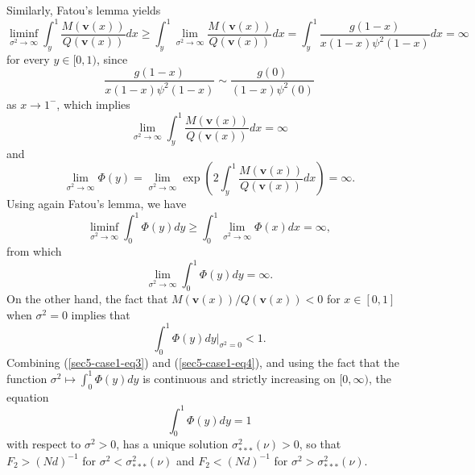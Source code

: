 \documentclass[11pt]{article}
\begin{document}
Similarly, Fatou's lemma yields
\begin{equation}
\liminf_{\sigma^2\rightarrow\infty}\int_{y}^{1}\frac{M(\mathbf{v}(x))}{Q(\mathbf{v}(x))}dx\geq\int_{y}^{1}\lim_{\sigma^2\rightarrow\infty}\frac{M(\mathbf{v}(x))}{Q(\mathbf{v}(x))}dx=\int_{y}^{1}\frac{g(1-x)}{x(1-x)\psi^2(1-x)}dx=\infty
\end{equation}
for every $y\in[0,1)$,
since 
\begin{equation}
\frac{g(1-x)}{x(1-x)\psi^2(1-x)}\sim \frac{g(0)}{(1-x)\psi^2(0)}
\end{equation}
as $x\rightarrow1^{-}$,
which implies
\begin{equation}
\lim_{\sigma^2\rightarrow\infty}\int_{y}^{1}\frac{M(\mathbf{v}(x))}{Q(\mathbf{v}(x))}dx=\infty
\end{equation}
and
  \begin{equation}
\lim_{\sigma^2\rightarrow\infty}\Phi(y)=\lim_{\sigma^2\rightarrow\infty}\exp\left(2\int_{y}^{1}\frac{M(\mathbf{v}(x))}{Q(\mathbf{v}(x))}dx\right)=\infty.
\end{equation}
Using again Fatou's lemma, we have
\begin{equation}
\liminf_{\sigma^2\rightarrow\infty}\int_{0}^{1}\Phi(y)dy\geq\int_{0}^{1}\lim_{\sigma^2\rightarrow\infty}\Phi(x)dx=\infty,
\end{equation}
from which 
\begin{equation}\label{sec5-case1-eq3}
\lim_{\sigma^2\rightarrow\infty}\int_{0}^{1}\Phi(y)dy=\infty.
\end{equation}
On the other hand,  the fact that  $M(\mathbf{v}(x))/Q(\mathbf{v}(x))<0$ for $x\in[0,1]$ when $\sigma^2=0$ implies that
\begin{equation}\label{sec5-case1-eq4}
\int_{0}^{1}\Phi(y)dy|_{\sigma^2=0}<1.
\end{equation}
Combining  (\ref{sec5-case1-eq3}) and (\ref{sec5-case1-eq4}), and using the fact that the function $\sigma^2\longmapsto\int_{0}^{1}\Phi(y)dy$ is continuous and strictly increasing on $[0,\infty)$, the equation
\begin{equation}
\int_{0}^{1}\Phi(y)dy=1
\end{equation}
with respect to $\sigma^2>0$,
has a unique solution $\sigma^2_{***}(\nu)>0$,
so that $F_2>(Nd)^{-1}$ for $\sigma^2<\sigma^2_{***}(\nu)$ and $F_2<(Nd)^{-1}$ for $\sigma^2>\sigma^2_{***}(\nu)$.
\end{document}
